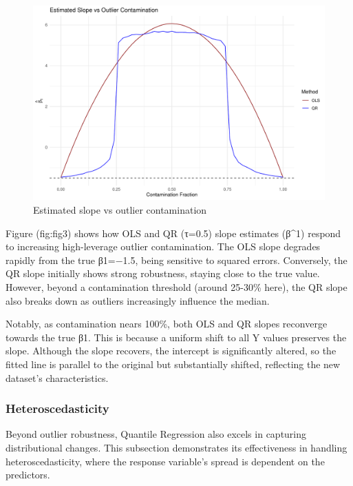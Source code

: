\documentclass[fleqn,10pt]{latex/stylish_article} %
\begin{document}
\begin{figure}[h]

{\centering \includegraphics[width=0.8\linewidth]{ADR_project_draft_files/figure-latex/fig3-1} 

}

\caption{Estimated slope vs outlier contamination}\label{fig:fig3}
\end{figure}

Figure \citet{ref}(fig:fig3) shows how OLS and QR (τ=0.5) slope estimates (β\^{}1) respond to increasing high-leverage outlier contamination. The OLS slope degrades rapidly from the true β1=−1.5, being sensitive to squared errors. Conversely, the QR slope initially shows strong robustness, staying close to the true value. However, beyond a contamination threshold (around 25-30\% here), the QR slope also breaks down as outliers increasingly influence the median.

Notably, as contamination nears 100\%, both OLS and QR slopes reconverge towards the true β1. This is because a uniform shift to all Y values preserves the slope. Although the slope recovers, the intercept is significantly altered, so the fitted line is parallel to the original but substantially shifted, reflecting the new dataset's characteristics.

\subsubsection{Heteroscedasticity}\label{heteroscedasticity}

Beyond outlier robustness, Quantile Regression also excels in capturing distributional changes. This subsection demonstrates its effectiveness in handling heteroscedasticity, where the response variable's spread is dependent on the predictors.
\end{document}
